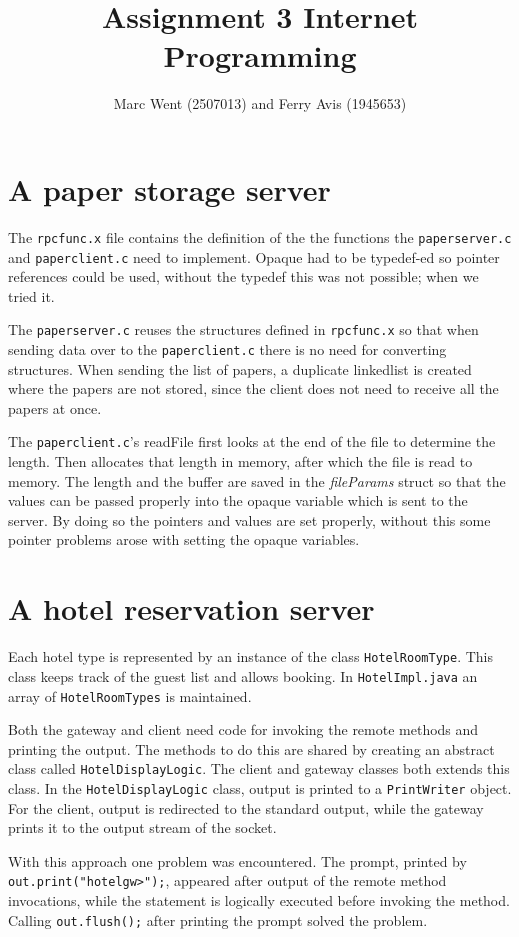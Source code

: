 \documentclass[11pt]{article}
\title{Assignment 3 Internet Programming}
\author{Marc Went (2507013) and Ferry Avis (1945653)}
\begin{document}
\maketitle
\section{A paper storage server}
The \texttt{rpcfunc.x} file contains the definition of the the functions the \texttt{paperserver.c} and \texttt{paperclient.c} need to implement. Opaque had to be typedef-ed so pointer references could be used, without the typedef this was not possible; when we tried it.

The \texttt{paperserver.c} reuses the structures defined in \texttt{rpcfunc.x} so that when sending data over to the \texttt{paperclient.c} there is no need for converting structures. When sending the list of papers, a duplicate linkedlist is created where the papers are not stored, since the client does not need to receive all the papers at once.

The \texttt{paperclient.c}'s readFile first looks at the end of the file to determine the length. Then allocates that length in memory, after which the file is read to memory. The length and the buffer are saved in the \textit{fileParams} struct so that the values can be passed properly into the opaque variable which is sent to the server. By doing so the pointers and values are set properly, without this some pointer problems arose with setting the opaque variables.

\section{A hotel reservation server}

Each hotel type is represented by an instance of the class \texttt{HotelRoomType}. This class keeps track of the guest list and allows booking. In \texttt{HotelImpl.java} an array of \texttt{HotelRoomTypes} is maintained.

Both the gateway and client need code for invoking the remote methods and printing the output. The methods to do this are shared by creating an abstract class called \texttt{HotelDisplayLogic}. The client and gateway classes both extends this class. In the \texttt{HotelDisplayLogic} class, output is printed to a \texttt{PrintWriter} object. For the client, output is redirected to the standard output, while the gateway prints it to the output stream of the socket.

With this approach one problem was encountered. The prompt, printed by \texttt{out.print("hotelgw>");}, appeared after output of the remote method invocations, while the statement is logically executed before invoking the method. Calling \texttt{out.flush();} after printing the prompt solved the problem.
\end{document}
